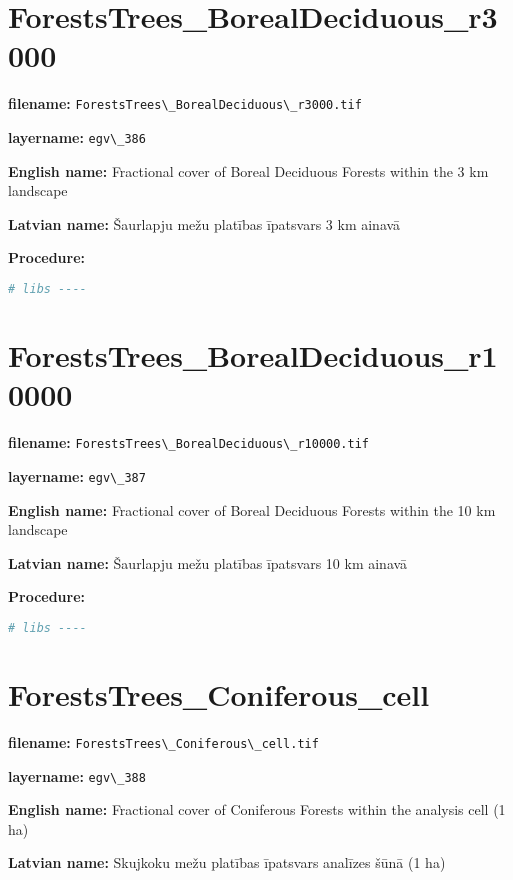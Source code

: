 \documentclass[
]{book}
\newcommand{\passthrough}[1]{#1}
\begin{document}
\section{ForestsTrees\_BorealDeciduous\_r3000}\label{ch06.386}

\textbf{filename:} \passthrough{\lstinline!ForestsTrees\_BorealDeciduous\_r3000.tif!}

\textbf{layername:} \passthrough{\lstinline!egv\_386!}

\textbf{English name:} Fractional cover of Boreal Deciduous Forests within the 3 km landscape

\textbf{Latvian name:} Šaurlapju mežu platības īpatsvars 3 km ainavā

\textbf{Procedure:}

\begin{lstlisting}[language=R]
# libs ----
\end{lstlisting}

\section{ForestsTrees\_BorealDeciduous\_r10000}\label{ch06.387}

\textbf{filename:} \passthrough{\lstinline!ForestsTrees\_BorealDeciduous\_r10000.tif!}

\textbf{layername:} \passthrough{\lstinline!egv\_387!}

\textbf{English name:} Fractional cover of Boreal Deciduous Forests within the 10 km landscape

\textbf{Latvian name:} Šaurlapju mežu platības īpatsvars 10 km ainavā

\textbf{Procedure:}

\begin{lstlisting}[language=R]
# libs ----
\end{lstlisting}

\section{ForestsTrees\_Coniferous\_cell}\label{ch06.388}

\textbf{filename:} \passthrough{\lstinline!ForestsTrees\_Coniferous\_cell.tif!}

\textbf{layername:} \passthrough{\lstinline!egv\_388!}

\textbf{English name:} Fractional cover of Coniferous Forests within the analysis cell (1 ha)

\textbf{Latvian name:} Skujkoku mežu platības īpatsvars analīzes šūnā (1 ha)
\end{document}
